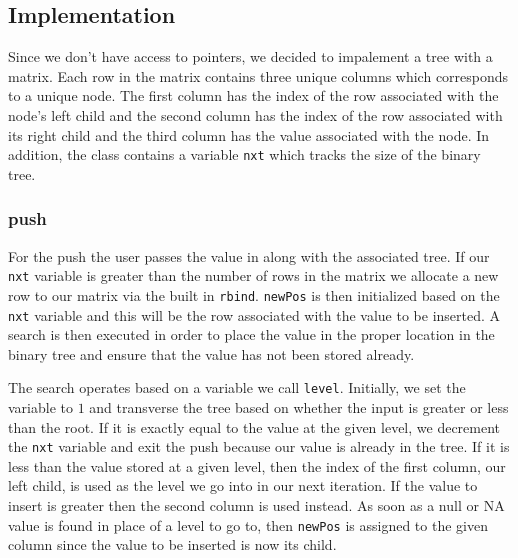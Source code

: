 \documentclass[11pt]{article}
\begin{document}
\subsection{Implementation} \label{trees:implementation}
Since we don't have access to pointers, we decided to impalement a tree with a matrix. Each row in the matrix contains three unique columns which corresponds to a unique node. The first column has the index of the row associated with the node's left child and the second column has the index of the row associated with its right child and the third column has the value associated with the node. In addition, the class contains a variable {\tt nxt} which tracks the size of the binary tree.

\subsubsection{push}
For the push the user passes the value in along with the associated tree. If our {\tt nxt} variable is greater than the number of rows in the matrix we allocate a new row to our matrix via the built in {\tt rbind}. {\tt newPos} is then initialized based on the {\tt nxt} variable and this will be the row associated with the value to be inserted. A search is then executed in order to place the value in the proper location in the binary tree and ensure that the value has not been stored already. 

The search operates based on a variable we call {\tt level}. Initially, we set the variable to $1$ and transverse the tree based on whether the input is greater or less than the root. If it is exactly equal to the value at the given level, we decrement the {\tt nxt} variable and exit the push because our value is already in the tree.  If it is less than the value stored at a given level, then the index of the first column, our left child, is used as the level we go into in our next iteration. If the value to insert is greater then the second column is used instead.  As soon as a null or NA value is found in place of a level to go to,  then {\tt newPos} is assigned to the given column since the value to be inserted is now its child.
\end{document}
